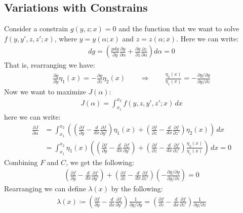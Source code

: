 \documentclass[11pt,oneside]{book}
\theoremstyle{break}
\theoremstyle{break}
\newcommand{\pd}{\partial}
\begin{document}
\subsection*{Variations with Constrains}
Consider a constrain $g(y,z;x) =0$ and the function that we want to solve $f(y,y',z,z'; x)$, where $y = y(\alpha;x)$ and $z = z(\alpha;x)$. Here we can write:
\begin{align*}
dg = \left( \frac{pd g}{\pd y}\frac{\pd y}{\pd \alpha} + \frac{\pd g}{\pd z}\frac{\pd z}{\pd \alpha}\right) d\alpha = 0
\end{align*}
That is, rearranging we have:
\begin{align*}
\frac{\pd g}{\pd y}\eta_1(x) = -\frac{\pd g}{\pd z}\eta_2(x) \qquad \Rightarrow \qquad \frac{\eta_2(x)}{\eta_1(x)} = -\frac{\pd g/ \pd y}{\pd g /\pd z} \tag{C}
\end{align*}
Now we want to maximize $J(\alpha)$:
\begin{align*}
J(\alpha) = \int_{x_1}^{x_2} f(y,z,y',z';x) \, dx
\end{align*}
here we can write:
\begin{align*}
\frac{\pd J}{\pd \alpha}&= \int_{x_1}^{x_2} \left( \left( \frac{\pd f}{\pd y} - \frac{d}{dx}\frac{\pd f}{\pd y'}\right) \eta_1(x) + \left( \frac{\pd f}{\pd z}- \frac{d}{dx}\frac{\pd f}{\pd z'}\right) \eta_2(x) \right)\, dx\\
&= \int_{x_1}^{x_2} \eta_1(x)\left( \left( \frac{\pd f}{\pd y} - \frac{d}{dx}\frac{\pd f}{\pd y'}\right)  + \left( \frac{\pd f}{\pd z}- \frac{d}{dx}\frac{\pd f}{\pd z'}\right) \frac{\eta_2(x)}{\eta_1(x)} \right)\, dx = 0 \tag{F}
\end{align*}
Combining $F$ and $C$, we get the following:
\begin{align*}
\left( \frac{\pd f}{\pd y} - \frac{d}{dx}\frac{\pd f}{\pd y'}\right)  + \left( \frac{\pd f}{\pd z}- \frac{d}{dx}\frac{\pd f}{\pd z'}\right) \left( -\frac{\pd g/ \pd y}{\pd g /\pd z}\right) = 0
\end{align*}
Rearranging we can define $\lambda(x)$ by the following:
\begin{align*}
\lambda(x) \coloneqq \left( \frac{\pd f}{\pd y} - \frac{d}{dx}\frac{\pd f}{\pd y'}\right)\frac{1}{\pd g/ \pd y}  = \left( \frac{\pd f}{\pd z}- \frac{d}{dx}\frac{\pd f}{\pd z'}\right)  \frac{1}{\pd g /\pd z} 
\end{align*}
\end{document}
